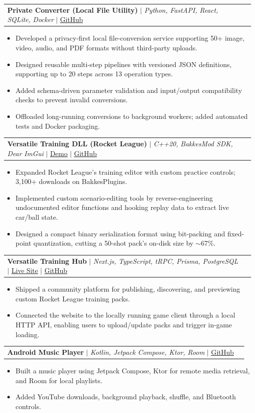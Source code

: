 \documentclass[letterpaper,11pt]{article}
\makeatletter
\newcommand{\resumeItem}[1]{
  \item\small{
    {#1 \vspace{-2pt}}
  }
}
\newcommand{\resumeProjectHeading}[2]{
    \item
    \begin{tabular*}{0.97\textwidth}{l@{\extracolsep{\fill}}r}
      \small#1 & #2 \\
    \end{tabular*}\vspace{-7pt}
}
\newcommand{\resumeItemListStart}{\begin{itemize}}
\newcommand{\resumeItemListEnd}{\end{itemize}\vspace{-5pt}}
\makeatother
\begin{document}
  \resumeProjectHeading
    {\textbf{Private Converter (Local File Utility)} $|$ \emph{Python, FastAPI, React, SQLite, Docker}
    $|$ \href{https://github.com/abdurisaq/PrivateConvert}{\underline{GitHub}}}{}
    \resumeItemListStart
      \resumeItem{Developed a privacy-first local file-conversion service supporting 50+ image, video, audio, and PDF formats without third-party uploads.}
      \resumeItem{Designed reusable multi-step pipelines with versioned JSON definitions, supporting up to 20 steps across 13 operation types.}
      \resumeItem{Added schema-driven parameter validation and input/output compatibility checks to prevent invalid conversions.}
      \resumeItem{Offloaded long-running conversions to background workers; added automated tests and Docker packaging.}
    \resumeItemListEnd

\resumeProjectHeading
  {\textbf{Versatile Training DLL (Rocket League)} $|$
  \emph{C++20, BakkesMod SDK, Dear ImGui} $|$
  \href{https://www.youtube.com/watch?v=9eDVzMzTQ7c}{\underline{Demo}} $|$
  \href{https://github.com/abdurisaq/VersatileTraining}{\underline{GitHub}}}{}
  
    \resumeItemListStart
            \resumeItem{Expanded Rocket League's training editor with custom practice controls; 3,100+ downloads on BakkesPlugins.}
            \resumeItem{Implemented custom scenario-editing tools by reverse-engineering undocumented editor functions and hooking replay data to extract live car/ball state.}
            \resumeItem{Designed a compact binary serialization format using bit-packing and fixed-point quantization, cutting a 50-shot pack’s on-disk size by $\sim$67\%.}
    \resumeItemListEnd
\resumeProjectHeading
  {\textbf{Versatile Training Hub} $|$
  \emph{Next.js, TypeScript, tRPC, Prisma, PostgreSQL} $|$
  \href{https://versatile-training-hub.vercel.app/}{\underline{Live Site}} $|$
  \href{https://github.com/abdurisaq/VersatileTrainingHub}{\underline{GitHub}}}{}
    \resumeItemListStart
         \resumeItem{Shipped a community platform for publishing, discovering, and previewing custom Rocket League training packs.}
         \resumeItem{Connected the website to the locally running game client through a local HTTP API, enabling users to upload/update packs and trigger in-game loading.}
    \resumeItemListEnd
        
  \resumeProjectHeading
    {\textbf{Android Music Player} $|$ \emph{Kotlin, Jetpack Compose, Ktor, Room}
    $|$ \href{https://github.com/abdurisaq/MusicApp}{\underline{GitHub}}}{}
    \resumeItemListStart
      \resumeItem{Built a music player using Jetpack Compose, Ktor for remote media retrieval, and Room for local playlists.}
      \resumeItem{Added YouTube downloads, background playback, shuffle, and Bluetooth controls.}
    \resumeItemListEnd
\end{document}
